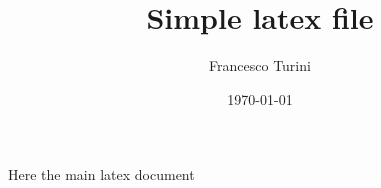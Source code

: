 \documentclass[a4paper]{article}
\title{Simple latex file}
\author{Francesco Turini}
\date{\today}
\begin{document}
\maketitle


Here the main latex document \cite{test}
\printbibliography
\end{document}
